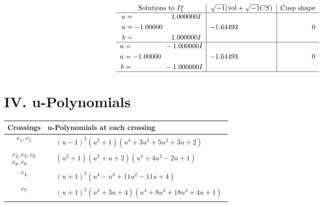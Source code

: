 \documentclass[1p]{elsarticle_modified}
\theoremstyle{definition}
\newcommand{\I}{\sqrt{-1}}
\begin{document}
$$\begin{array}{c|c|c}  
\text{Solutions to }I^u_{3}& \I (\text{vol} + \sqrt{-1}CS) & \text{Cusp shape}\\
 \hline 
\begin{aligned}
u &= \phantom{-0.000000 -}1.000000 I \\
a &= -1.00000\phantom{ +0.000000I} \\
b &= \phantom{-0.000000 -}1.000000 I\end{aligned}
 & -1.64493\phantom{ +0.000000I} & \phantom{-0.000000 } 0 \\ \hline\begin{aligned}
u &= \phantom{-0.000000 } -1.000000 I \\
a &= -1.00000\phantom{ +0.000000I} \\
b &= \phantom{-0.000000 } -1.000000 I\end{aligned}
 & -1.64493\phantom{ +0.000000I} & \phantom{-0.000000 } 0\\
 \hline 
 \end{array}$$\newpage
\newpage\renewcommand{\arraystretch}{1}
\centering \section*{ IV. u-Polynomials}
\begin{tabular}{m{50pt}|m{274pt}}
Crossings & \hspace{64pt}u-Polynomials at each crossing \\
\hline $$\begin{aligned}c_{1},c_{5}\end{aligned}$$&$\begin{aligned}
&(u-1)^2(u^2+1)(u^4+3 u^3+5 u^2+3 u+2)
\end{aligned}$\\
\hline $$\begin{aligned}c_{2},c_{3},c_{6}\\c_{8},c_{9}\end{aligned}$$&$\begin{aligned}
&(u^2+1)(u^2+u+2)(u^4+4 u^2-2 u+1)
\end{aligned}$\\
\hline $$\begin{aligned}c_{4}\end{aligned}$$&$\begin{aligned}
&(u+1)^4(u^4- u^3+11 u^2-11 u+4)
\end{aligned}$\\
\hline $$\begin{aligned}c_{7}\end{aligned}$$&$\begin{aligned}
&(u+1)^2(u^2+3 u+4)(u^4+8 u^3+18 u^2+4 u+1)
\end{aligned}$\\
\hline
\end{tabular}\newpage\renewcommand{\arraystretch}{1}
\end{document}
